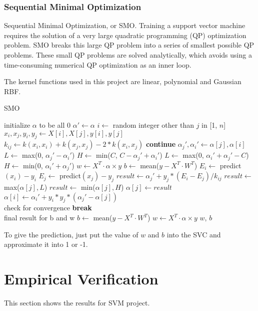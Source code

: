 \documentclass[9pt,shortpaper,twoside,web]{ieeecolor}
\begin{document}
\subsubsection{Sequential Minimal Optimization}
Sequential Minimal Optimization, or SMO. Training a support vector machine requires the solution of a very large quadratic programming (QP) optimization problem. SMO breaks this large QP problem into a series of smallest possible QP problems. These small QP problems are solved analytically, which avoids using a time-consuming numerical QP optimization as an inner loop. \cite{smo} \par
The kernel functions used in this project are linear, polynomial and Gaussian RBF. 
\begin{algorithm}
\caption{SMO}
\begin{algorithmic} [1]
\STATE initialize $\alpha$ to be all 0
\STATE $\alpha'\gets \alpha$
\STATE $i \gets$ random integer other than $j$ in [1, $n$]
\STATE $x_i, x_j, y_i, y_j \gets X[i], X[j], y[i], y[j]$
\STATE $k_{ij} \gets k(x_i, x_i) + k(x_j, x_j) - 2 * k(x_i, x_j)$
\STATE \textbf{continue}
\ENDIF
\STATE $\alpha_j', \alpha_i' \gets \alpha[j], \alpha[i]$
\STATE $L\gets$  max(0, $\alpha_j' - \alpha_i'$)
\STATE $H\gets$  min($C$, $C - \alpha_j' + \alpha_i'$)
\ELSE
\STATE $L\gets$  max(0, $\alpha_i' + \alpha_j' -C$)
\STATE $H\gets$  min(0, $\alpha_i' + \alpha_j'$)
\ENDIF
\STATE $w\gets X^T \cdot \alpha \times y$
\STATE $b\gets$  mean($y - X^T \cdot W^T$)
\STATE $E_i \gets $ predict$(x_i) - y_i$
\STATE $E_j \gets $ predict$(x_j) - y_j$
\STATE $result \gets \alpha_j' + y_j * (E_i - E_j) / k_{ij}$
\STATE $result \gets$ max($\alpha[j], L$)
\STATE $result \gets$ min($\alpha[j], H$)
\STATE $\alpha[j] \gets result$
\STATE $\alpha[i] \gets \alpha_i' + y_i * y_j * (\alpha_j' - \alpha[j])$
\ENDFOR  
\\ check for convergence
\STATE \textbf{break}
\ENDIF
\\ final result for b and w
\STATE $b\gets$  mean($y - X^T \cdot W^T$)
\STATE $w\gets X^T \cdot \alpha \times y$
\ENDIF
\ENDWHILE
\RETURN $w$, $b$
\end{algorithmic}
\end{algorithm}

To give the prediction, just put the value of $w$ and $b$ into the SVC and approximate it into 1 or -1.

\section{Empirical Verification}
This section shows the results for SVM project.
\end{document}
